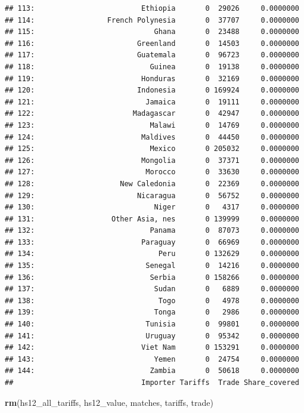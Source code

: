 \documentclass[10pt,]{article}
\newenvironment{Shaded}{\begin{snugshade}}{\end{snugshade}}
\newcommand{\KeywordTok}[1]{\textcolor[rgb]{0.13,0.29,0.53}{\textbf{{#1}}}}
\newcommand{\NormalTok}[1]{{#1}}
\begin{document}
\begin{verbatim}
## 113:                         Ethiopia       0  29026     0.0000000
## 114:                 French Polynesia       0  37707     0.0000000
## 115:                            Ghana       0  23488     0.0000000
## 116:                        Greenland       0  14503     0.0000000
## 117:                        Guatemala       0  96723     0.0000000
## 118:                           Guinea       0  19138     0.0000000
## 119:                         Honduras       0  32169     0.0000000
## 120:                        Indonesia       0 169924     0.0000000
## 121:                          Jamaica       0  19111     0.0000000
## 122:                       Madagascar       0  42947     0.0000000
## 123:                           Malawi       0  14769     0.0000000
## 124:                         Maldives       0  44450     0.0000000
## 125:                           Mexico       0 205032     0.0000000
## 126:                         Mongolia       0  37371     0.0000000
## 127:                          Morocco       0  33630     0.0000000
## 128:                    New Caledonia       0  22369     0.0000000
## 129:                        Nicaragua       0  56752     0.0000000
## 130:                            Niger       0   4317     0.0000000
## 131:                  Other Asia, nes       0 139999     0.0000000
## 132:                           Panama       0  87073     0.0000000
## 133:                         Paraguay       0  66969     0.0000000
## 134:                             Peru       0 132629     0.0000000
## 135:                          Senegal       0  14216     0.0000000
## 136:                           Serbia       0 158266     0.0000000
## 137:                            Sudan       0   6889     0.0000000
## 138:                             Togo       0   4978     0.0000000
## 139:                            Tonga       0   2986     0.0000000
## 140:                          Tunisia       0  99801     0.0000000
## 141:                          Uruguay       0  95342     0.0000000
## 142:                         Viet Nam       0 153291     0.0000000
## 143:                            Yemen       0  24754     0.0000000
## 144:                           Zambia       0  50618     0.0000000
##                              Importer Tariffs  Trade Share_covered
\end{verbatim}

\begin{Shaded}
\begin{Highlighting}[]
\KeywordTok{rm}\NormalTok{(hs12_all_tariffs, hs12_value, matches, tariffs, trade)}
\end{Highlighting}
\end{Shaded}
\end{document}
